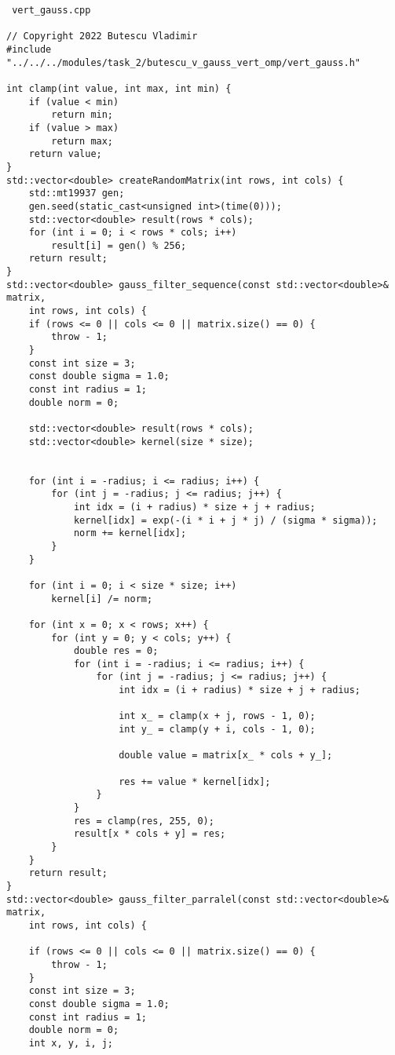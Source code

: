 \documentclass{report}
\begin{document}
\begin{lstlisting}
 vert_gauss.cpp

// Copyright 2022 Butescu Vladimir
#include "../../../modules/task_2/butescu_v_gauss_vert_omp/vert_gauss.h"

int clamp(int value, int max, int min) {
    if (value < min)
        return min;
    if (value > max)
        return max;
    return value;
}
std::vector<double> createRandomMatrix(int rows, int cols) {
    std::mt19937 gen;
    gen.seed(static_cast<unsigned int>(time(0)));
    std::vector<double> result(rows * cols);
    for (int i = 0; i < rows * cols; i++)
        result[i] = gen() % 256;
    return result;
}
std::vector<double> gauss_filter_sequence(const std::vector<double>& matrix,
    int rows, int cols) {
    if (rows <= 0 || cols <= 0 || matrix.size() == 0) {
        throw - 1;
    }
    const int size = 3;
    const double sigma = 1.0;
    const int radius = 1;
    double norm = 0;

    std::vector<double> result(rows * cols);
    std::vector<double> kernel(size * size);


    for (int i = -radius; i <= radius; i++) {
        for (int j = -radius; j <= radius; j++) {
            int idx = (i + radius) * size + j + radius;
            kernel[idx] = exp(-(i * i + j * j) / (sigma * sigma));
            norm += kernel[idx];
        }
    }

    for (int i = 0; i < size * size; i++)
        kernel[i] /= norm;

    for (int x = 0; x < rows; x++) {
        for (int y = 0; y < cols; y++) {
            double res = 0;
            for (int i = -radius; i <= radius; i++) {
                for (int j = -radius; j <= radius; j++) {
                    int idx = (i + radius) * size + j + radius;

                    int x_ = clamp(x + j, rows - 1, 0);
                    int y_ = clamp(y + i, cols - 1, 0);

                    double value = matrix[x_ * cols + y_];

                    res += value * kernel[idx];
                }
            }
            res = clamp(res, 255, 0);
            result[x * cols + y] = res;
        }
    }
    return result;
}
std::vector<double> gauss_filter_parralel(const std::vector<double>& matrix,
    int rows, int cols) {

    if (rows <= 0 || cols <= 0 || matrix.size() == 0) {
        throw - 1;
    }
    const int size = 3;
    const double sigma = 1.0;
    const int radius = 1;
    double norm = 0;
    int x, y, i, j;


\end{lstlisting}
\end{document}
